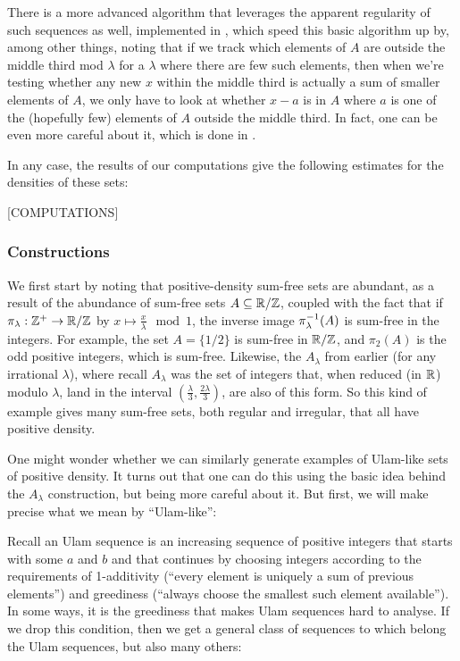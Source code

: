 \documentclass{article}
\theoremstyle{definition}
\theoremstyle{remark}
\numberwithin{equation}{section}
\begin{document}
{There is a more advanced algorithm that leverages the apparent
regularity of such sequences as well, implemented in
\cite{knuth_algorithm}, which speed this basic algorithm up by, among
other things, noting that if we track which elements of $A$ are
outside the middle third mod $\lambda$ for a $\lambda$ where there are
few such elements, then when we're testing whether any new $x$ within
the middle third is actually a sum of smaller elements of $A$, we only
have to look at whether $x - a$ is in $A$ where $a$ is one of the
(hopefully few) elements of $A$ outside the middle third.  In fact,
one can be even more careful about it, which is done in
\cite{knuth_algorithm}.

In any case, the results of our computations give the following
estimates for the densities of these sets: 

{\color{red}[COMPUTATIONS]}

\subsubsection{Constructions}

We first start by noting that positive-density sum-free sets are
abundant, as a result of the abundance of sum-free sets
$A \subseteq \mathbb{R}/\mathbb{Z}$, coupled with the fact that if
$\pi_\lambda : \mathbb{Z}^+ \to \mathbb{R}/\mathbb{Z}$ by
$x \mapsto \frac{x}{\lambda} \mod{1}$, the inverse image
$\pi_\lambda^{-1}(A)$ is sum-free in the integers.  For example, the
set $A = \{1/2\}$ is sum-free in $\mathbb{R}/\mathbb{Z}$, and $\pi_2(A)$ is the odd
positive integers, which is sum-free.  Likewise, the $A_\lambda$ from
earlier (for any irrational $\lambda$), where recall $A_\lambda$ was
the set of integers that, when reduced (in $\mathbb{R}$) modulo $\lambda$,
land in the interval $(\frac{\lambda}{3}, \frac{2\lambda}{3})$, are
also of this form.  So this kind of example gives many sum-free sets,
both regular and irregular, that all have positive density.

One might wonder whether we can similarly generate examples of
Ulam-like sets of positive density.  It turns out that one can do this
using the basic idea behind the $A_\lambda$ construction, but being
more careful about it.  But first, we will make precise what we mean
by ``Ulam-like'': 

Recall an Ulam sequence is an increasing sequence of positive integers
that starts with some $a$ and $b$ and that continues by choosing
integers according to the requirements of 1-additivity (``every
element is uniquely a sum of previous elements'') and greediness
(``always choose the smallest such element available'').  In some
ways, it is the greediness that makes Ulam sequences hard to analyse.
If we drop this condition, then we get a general class of sequences to
which belong the Ulam sequences, but also many others:

}
\end{document}
